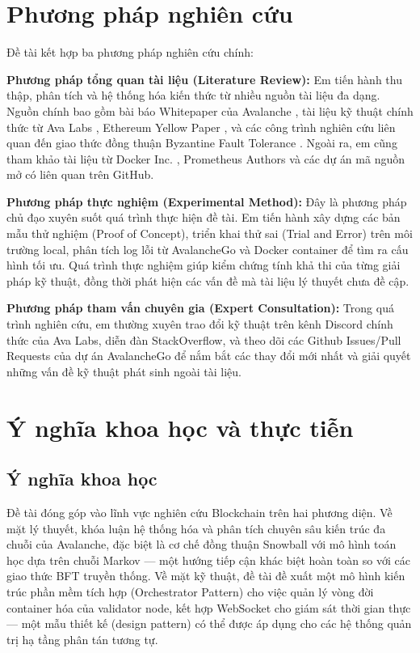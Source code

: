 \section{Phương pháp nghiên cứu}

Đề tài kết hợp ba phương pháp nghiên cứu chính:

\textbf{Phương pháp tổng quan tài liệu (Literature Review):} Em tiến hành thu thập, phân tích và hệ thống hóa kiến thức từ nhiều nguồn tài liệu đa dạng. Nguồn chính bao gồm bài báo Whitepaper của Avalanche \cite{rocket2020avalanche}, tài liệu kỹ thuật chính thức từ Ava Labs \cite{avalabs2023docs}, Ethereum Yellow Paper \cite{wood2014ethereum}, và các công trình nghiên cứu liên quan đến giao thức đồng thuận Byzantine Fault Tolerance \cite{lamport1982byzantine, castro1999practical}. Ngoài ra, em cũng tham khảo tài liệu từ Docker Inc. \cite{docker2023docs}, Prometheus Authors \cite{prometheus2023docs} và các dự án mã nguồn mở có liên quan trên GitHub.

\textbf{Phương pháp thực nghiệm (Experimental Method):} Đây là phương pháp chủ đạo xuyên suốt quá trình thực hiện đề tài. Em tiến hành xây dựng các bản mẫu thử nghiệm (Proof of Concept), triển khai thử sai (Trial and Error) trên môi trường local, phân tích log lỗi từ AvalancheGo và Docker container để tìm ra cấu hình tối ưu. Quá trình thực nghiệm giúp kiểm chứng tính khả thi của từng giải pháp kỹ thuật, đồng thời phát hiện các vấn đề mà tài liệu lý thuyết chưa đề cập.

\textbf{Phương pháp tham vấn chuyên gia (Expert Consultation):} Trong quá trình nghiên cứu, em thường xuyên trao đổi kỹ thuật trên kênh Discord chính thức của Ava Labs, diễn đàn StackOverflow, và theo dõi các Github Issues/Pull Requests của dự án AvalancheGo để nắm bắt các thay đổi mới nhất và giải quyết những vấn đề kỹ thuật phát sinh ngoài tài liệu.

\section{Ý nghĩa khoa học và thực tiễn}

\subsection{Ý nghĩa khoa học}

Đề tài đóng góp vào lĩnh vực nghiên cứu Blockchain trên hai phương diện. Về mặt lý thuyết, khóa luận hệ thống hóa và phân tích chuyên sâu kiến trúc đa chuỗi của Avalanche, đặc biệt là cơ chế đồng thuận Snowball với mô hình toán học dựa trên chuỗi Markov --- một hướng tiếp cận khác biệt hoàn toàn so với các giao thức BFT truyền thống. Về mặt kỹ thuật, đề tài đề xuất một mô hình kiến trúc phần mềm tích hợp (Orchestrator Pattern) cho việc quản lý vòng đời container hóa của validator node, kết hợp WebSocket cho giám sát thời gian thực --- một mẫu thiết kế (design pattern) có thể được áp dụng cho các hệ thống quản trị hạ tầng phân tán tương tự.

